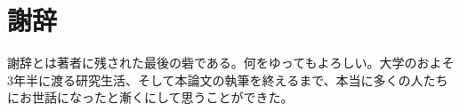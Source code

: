 \chapter*{謝辞}
謝辞とは著者に残された最後の砦である。何をゆってもよろしい。大学のおよそ3年半に渡る研究生活、そして本論文の執筆を終えるまで、本当に多くの人たちにお世話になったと漸くにして思うことができた。
